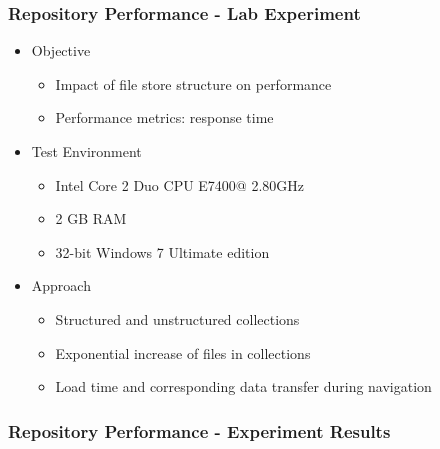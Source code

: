 \documentclass[xcolor=dvitex,t,11pt]{beamer}
\begin{document}
\begin{frame}[fragile]
\frametitle{Repository Performance - Lab Experiment}
\begin{itemize}
\item<1-> Objective
\begin{itemize}
\item<2-> Impact of file store structure on performance
\item<3-> Performance metrics: response time
\end{itemize}
\item<4-> Test Environment
\begin{itemize}
\item<5-> Intel Core 2 Duo CPU E7400@ 2.80GHz
\item<6-> 2 GB RAM
\item<7-> 32-bit Windows 7 Ultimate edition
\end{itemize} 
\item<8-> Approach
\begin{itemize}
\item<9-> Structured and unstructured collections
\item<10-> Exponential increase of files in collections
\item<11-> Load time and corresponding data transfer during navigation
\end{itemize}
\end{itemize}
\end{frame}


\begin{frame}[fragile]
\frametitle{Repository Performance - Experiment Results}
\centering

\end{frame}
\end{document}
